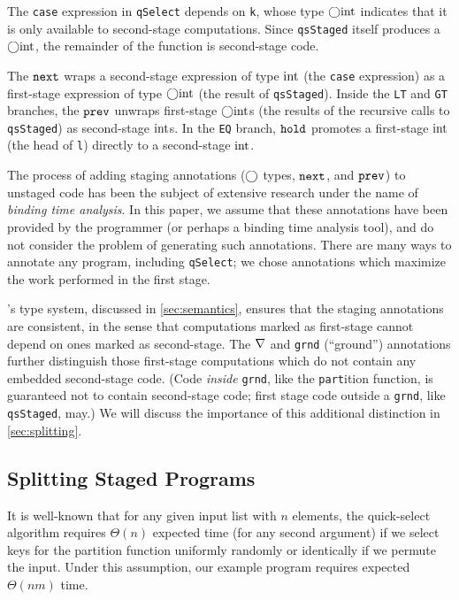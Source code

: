 \begin{abstrsyn}
The \texttt{case} expression in \texttt{qSelect} depends on \texttt{k}, whose
type $\bigcirc{\rm int}$ indicates that it is only available to second-stage
computations. Since \texttt{qsStaged} itself produces a $\bigcirc{\rm int}$, the
remainder of the function is second-stage code.

The ${\tt next}$ wraps a second-stage expression of type ${\rm int}$ (the \texttt{case}
expression) as a first-stage expression of type $\bigcirc{\rm int}$ (the result 
of \texttt{qsStaged}). Inside the \texttt{LT} and \texttt{GT} branches, the
${\tt prev}$ unwraps first-stage $\bigcirc{\rm int}$s (the results of the recursive calls
to \texttt{qsStaged}) as second-stage ${\rm int}$s. In the \texttt{EQ} branch,
${\tt hold}$ promotes a first-stage ${\rm int}$ (the head of \texttt{l}) directly to a
second-stage ${\rm int}$.

The process of adding staging annotations ($\bigcirc$ types, ${\tt next}$, and ${\tt prev}$)
to unstaged code has been the subject of extensive research under the
name of \emph{binding time analysis}. In this paper, we assume that these
annotations have been provided by the programmer (or perhaps a binding time
analysis tool), and do not consider the problem of generating such annotations.
There are many ways to annotate any program, including \texttt{qSelect}; we
chose annotations which maximize the work performed in the first stage.

\lang's type system, discussed in \ref{sec:semantics}, ensures that the staging
annotations are consistent, in the sense that computations marked as
first-stage cannot depend on ones marked as second-stage. The $\nabla$ and
\texttt{grnd} (``ground'') annotations further distinguish those first-stage computations
which do not contain any embedded second-stage code. (Code \emph{inside}
\texttt{grnd}, like the \texttt{part}ition function, is guaranteed not to
contain second-stage code; first stage code outside a \texttt{grnd}, 
like \texttt{qsStaged}, may.) We will
discuss the importance of this additional distinction in \ref{sec:splitting}.



\subsection{Splitting Staged Programs}



It is well-known that for any given input list with $n$ elements, the
quick-select algorithm requires $\Theta(n)$ expected time (for any
second argument) if we select keys for the partition function
uniformly randomly or identically if we permute the input. Under this
assumption, our example program requires expected $\Theta(nm)$ time.


\end{abstrsyn}
